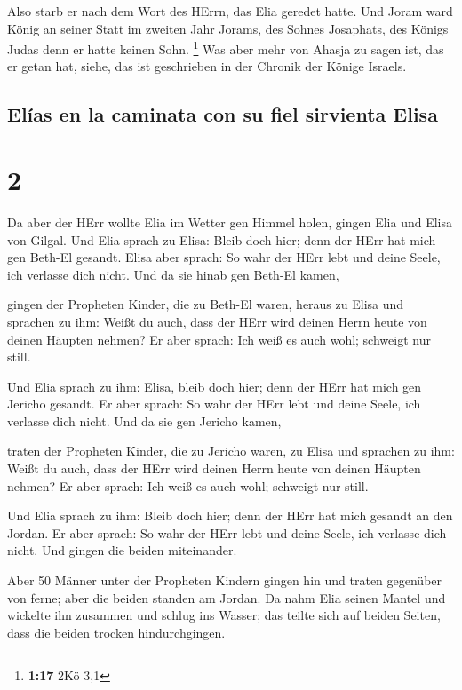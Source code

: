  Also starb er nach dem Wort des HErrn, das Elia geredet
hatte. Und Joram ward König an seiner Statt im zweiten Jahr Jorams, des
Sohnes Josaphats, des Königs Judas denn er hatte keinen Sohn.
\footnote{\textbf{1:17} 2Kö 3,1}  Was aber mehr von
Ahasja zu sagen ist, das er getan hat, siehe, das ist geschrieben in der
Chronik der Könige Israels.

\hypertarget{eluxedas-en-la-caminata-con-su-fiel-sirvienta-elisa}{%
\subsection{Elías en la caminata con su fiel sirvienta
Elisa}\label{eluxedas-en-la-caminata-con-su-fiel-sirvienta-elisa}}

\hypertarget{section-1}{%
\section{2}\label{section-1}}

 Da aber der HErr wollte Elia im Wetter gen Himmel holen,
gingen Elia und Elisa von Gilgal.  Und Elia sprach zu
Elisa: Bleib doch hier; denn der HErr hat mich gen Beth-El gesandt.
Elisa aber sprach: So wahr der HErr lebt und deine Seele, ich verlasse
dich nicht. Und da sie hinab gen Beth-El kamen,

 gingen der Propheten Kinder, die zu Beth-El waren, heraus
zu Elisa und sprachen zu ihm: Weißt du auch, dass der HErr wird deinen
Herrn heute von deinen Häupten nehmen? Er aber sprach: Ich weiß es auch
wohl; schweigt nur still.

 Und Elia sprach zu ihm: Elisa, bleib doch hier; denn der
HErr hat mich gen Jericho gesandt. Er aber sprach: So wahr der HErr lebt
und deine Seele, ich verlasse dich nicht. Und da sie gen Jericho kamen,

 traten der Propheten Kinder, die zu Jericho waren, zu
Elisa und sprachen zu ihm: Weißt du auch, dass der HErr wird deinen
Herrn heute von deinen Häupten nehmen? Er aber sprach: Ich weiß es auch
wohl; schweigt nur still.

 Und Elia sprach zu ihm: Bleib doch hier; denn der HErr
hat mich gesandt an den Jordan. Er aber sprach: So wahr der HErr lebt
und deine Seele, ich verlasse dich nicht. Und gingen die beiden
miteinander.

 Aber 50 Männer unter der Propheten Kindern gingen hin und
traten gegenüber von ferne; aber die beiden standen am Jordan.
 Da nahm Elia seinen Mantel und wickelte ihn zusammen und
schlug ins Wasser; das teilte sich auf beiden Seiten, dass die beiden
trocken hindurchgingen.

